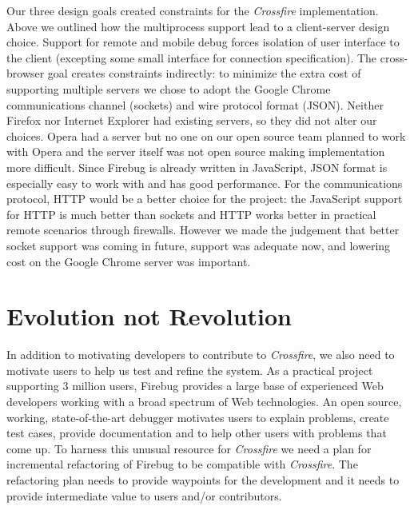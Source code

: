 Our three design goals created constraints for the \textit{Crossfire} implementation.
Above we outlined
how the multiprocess support lead to a client-server design choice. Support for
remote and mobile debug forces isolation of user interface to the client
(excepting some small interface for connection specification). The cross-browser
goal creates constraints indirectly: to minimize the extra cost of supporting
multiple servers we chose to adopt the Google Chrome communications channel
(sockets) and wire protocol format (JSON). Neither Firefox nor Internet Explorer
had existing servers, so they did not alter our choices. Opera had a server but
no one on our open source team planned to work with Opera and the server itself
was not open source making implementation more difficult.  Since Firebug is
already written in JavaScript, JSON format is especially easy to work with and
has good performance\cite{JSON}.  For the communications protocol, HTTP would be
a better choice for the project: the JavaScript support for HTTP is much better
than sockets and HTTP works better in practical remote scenarios through
firewalls.  However we made the judgement that better socket support was coming
in future\cite{WebSockets}, support was adequate now, and lowering cost on the
Google Chrome server was important.

\section{Evolution not Revolution}
In addition to motivating developers to contribute to \textit{Crossfire}, we also need to motivate users
to help us test and refine the system.
As a practical project supporting 3 million users, Firebug
provides a large base of experienced Web developers working with a broad spectrum of Web technologies.
An open source, working, state-of-the-art debugger motivates users to explain problems, create test cases,
provide documentation and to help other users with problems that come up. To harness this
 unusual resource  for \textit{Crossfire} we need a plan for incremental refactoring of Firebug to be compatible
with \textit{Crossfire}.  The refactoring plan needs to provide waypoints for the development and it needs to
provide intermediate value to users and/or contributors.


